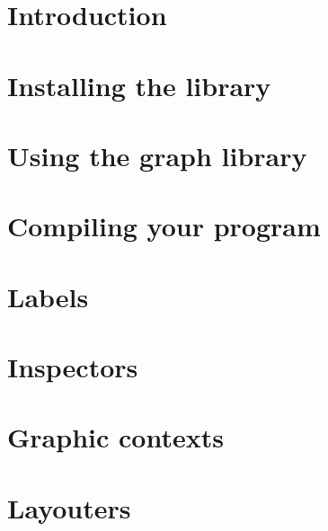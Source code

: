 \documentclass[a4paper]{article}
\begin{document}
\newpage 
\thispagestyle{empty}

\newpage

\pagestyle{headings}

\tableofcontents

\newpage

\section{Introduction} 
\label{introduction}



\section{Installing the library} 
\label{installing}



\section{Using the graph library}  
\label{using_the_graph_library}



\section{Compiling your program}
\label{compiling_your_program}



\section{Labels}  
\label{labels}



\section{Inspectors}
\label{inspectors}



\section{Graphic contexts}
\label{graphic}



\section{Layouters}  
\label{layouters}
\end{document}

